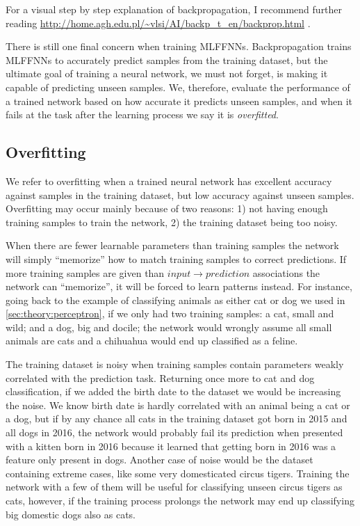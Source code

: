 For a visual step by step explanation of backpropagation, I recommend further reading \url{http://home.agh.edu.pl/~vlsi/AI/backp_t_en/backprop.html} \cite{Bernacki2005}.

There is still one final concern when training MLFFNNs.
Backpropagation trains MLFFNNs to accurately predict samples from the training dataset, but the ultimate goal of training a neural network, we must not forget, is making it capable of predicting unseen samples.
We, therefore, evaluate the performance of a trained network based on how accurate it predicts unseen samples, and when it fails at the task after the learning process we say it is \emph{overfitted}.


\subsection{Overfitting}
\label{sec:theory:mlffnn:overfitting}

We refer to overfitting when a trained neural network has excellent accuracy against samples in the training dataset, but low accuracy against unseen samples.
Overfitting may occur mainly because of two reasons: 1) not having enough training samples to train the network, 2) the training dataset being too noisy.

When there are fewer learnable parameters than training samples the network will simply ``memorize'' how to match training samples to correct predictions.
If more training samples are given than $input \rightarrow prediction$ associations the network can ``memorize'', it will be forced to learn patterns instead.
For instance, going back to the example of classifying animals as either cat or dog we used in \autoref{sec:theory:perceptron}, if we only had two training samples: a cat, small and wild; and a dog, big and docile; the network would wrongly assume all small animals are cats and a chihuahua would end up classified as a feline.

The training dataset is noisy when training samples contain parameters weakly correlated with the prediction task.
Returning once more to cat and dog classification, if we added the birth date to the dataset we would be increasing the noise.
We know birth date is hardly correlated with an animal being a cat or a dog, but if by any chance all cats in the training dataset got born in 2015 and all dogs in 2016, the network would probably fail its prediction when presented with a kitten born in 2016 because it learned that getting born in 2016 was a feature only present in dogs.
Another case of noise would be the dataset containing extreme cases, like some very domesticated circus tigers.
Training the network with a few of them will be useful for classifying unseen circus tigers as cats, however, if the training process prolongs the network may end up classifying big domestic dogs also as cats.

